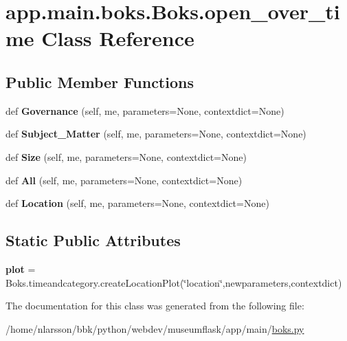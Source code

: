 \hypertarget{classapp_1_1main_1_1boks_1_1Boks_1_1open__over__time}{}\section{app.\+main.\+boks.\+Boks.\+open\+\_\+over\+\_\+time Class Reference}
\label{classapp_1_1main_1_1boks_1_1Boks_1_1open__over__time}
\subsection*{Public Member Functions}
\begin{DoxyCompactItemize}
\item 
\mbox{\label{classapp_1_1main_1_1boks_1_1Boks_1_1open__over__time_a9728d9fedb2b3f37680fbc43f8e224b2}} 
def {\bfseries Governance} (self, me, parameters=None, contextdict=None)
\item 
\mbox{\label{classapp_1_1main_1_1boks_1_1Boks_1_1open__over__time_acb911674c3b70842f7df84f3e1789095}} 
def {\bfseries Subject\+\_\+\+Matter} (self, me, parameters=None, contextdict=None)
\item 
\mbox{\label{classapp_1_1main_1_1boks_1_1Boks_1_1open__over__time_a02570582a07a69d7725030c52e8cc8ca}} 
def {\bfseries Size} (self, me, parameters=None, contextdict=None)
\item 
\mbox{\label{classapp_1_1main_1_1boks_1_1Boks_1_1open__over__time_a39f54a906b1ec3807310c4daf56c9369}} 
def {\bfseries All} (self, me, parameters=None, contextdict=None)
\item 
\mbox{\label{classapp_1_1main_1_1boks_1_1Boks_1_1open__over__time_a52c3a422473629035a3da55c70c0910b}} 
def {\bfseries Location} (self, me, parameters=None, contextdict=None)
\end{DoxyCompactItemize}
\subsection*{Static Public Attributes}
\begin{DoxyCompactItemize}
\item 
\mbox{\label{classapp_1_1main_1_1boks_1_1Boks_1_1open__over__time_a7481b4e7bbaf2298ebd463c3c9176b03}} 
{\bfseries plot} = Boks.\+timeandcategory.\+create\+Location\+Plot(\char`\"{}location\char`\"{},newparameters,contextdict)
\end{DoxyCompactItemize}


The documentation for this class was generated from the following file\+:\begin{DoxyCompactItemize}
\item 
/home/nlarsson/bbk/python/webdev/museumflask/app/main/\mbox{\hyperlink{boks_8py}{boks.\+py}}\end{DoxyCompactItemize}
